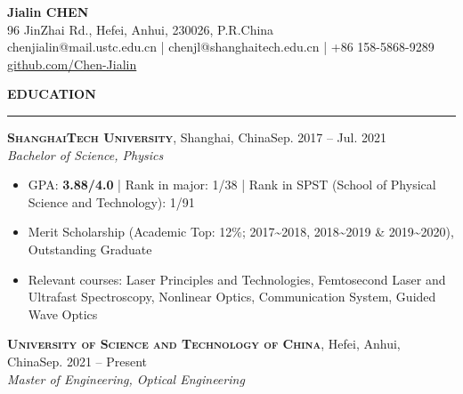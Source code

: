 \documentclass[letterpaper,11pt]{article}
\begin{document}
\begin{center}
    {\LARGE\bfseries{}Jialin CHEN}\\
    \vspace{1ex}
    96 JinZhai Rd., Hefei, Anhui, 230026, P.R.China\\
    chenjialin@mail.ustc.edu.cn | chenjl@shanghaitech.edu.cn | +86 158-5868-9289\\
    \href{https://github.com/Chen-Jialin}{github.com/Chen-Jialin}\\
\end{center}
\vspace{-1ex}

{\Large\bfseries{}EDUCATION}\\
\vspace{-1ex}
\rule[1.5ex]{\columnwidth}{1pt}
{\large\bfseries\scshape{}ShanghaiTech University}, {Shanghai, China}\hfill{Sep. 2017 -- Jul. 2021}\\
{\itshape{}Bachelor of Science, Physics}\\
\vspace{-4ex}
\begin{itemize}
    \item GPA: \textbf{3.88/4.0} | Rank in major: 1/38 | Rank in SPST (School of Physical Science and Technology): 1/91
    \item Merit Scholarship (Academic Top: 12\%; 2017\textasciitilde2018, 2018\textasciitilde2019 \& 2019\textasciitilde2020), Outstanding Graduate
    \item Relevant courses: Laser Principles and Technologies, Femtosecond Laser and Ultrafast Spectroscopy, Nonlinear Optics, Communication System, Guided Wave Optics
\end{itemize}
{\large\bfseries\scshape{}University of Science and Technology of China}, {Hefei, Anhui, China}\hfill{Sep. 2021 -- Present}\\
{\itshape{}Master of Engineering, Optical Engineering}\\
\vspace{-2ex}%
\end{document}
